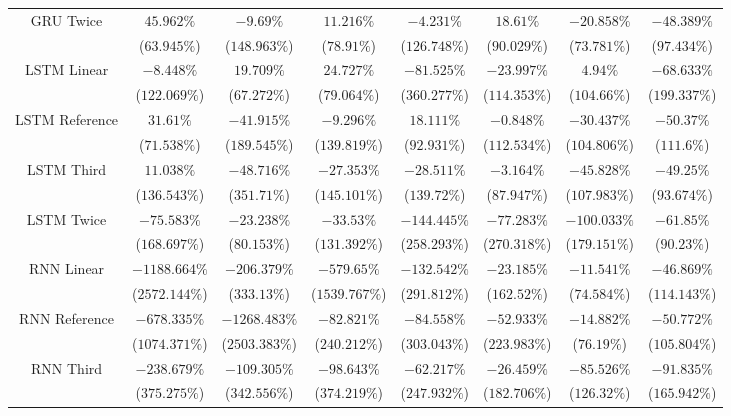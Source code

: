 \begin{table}[!ht]
{\begin{tabular}{|c|c|c|c|c|c|c|c|}
			\multirow{2}{*}{GRU Twice} & $45.962\%$ & $-9.69\%$ & $11.216\%$ & $-4.231\%$ & $18.61\%$ & $-20.858\%$ & $-48.389\%$ \\
			 & ($63.945\%$) & ($148.963\%$) & ($78.91\%$) & ($126.748\%$) & ($90.029\%$) & ($73.781\%$) & ($97.434\%$) \\ \hline
			\multirow{2}{*}{LSTM Linear} & $-8.448\%$ & $19.709\%$ & $24.727\%$ & $-81.525\%$ & $-23.997\%$ & $4.94\%$ & $-68.633\%$ \\
			 & ($122.069\%$) & ($67.272\%$) & ($79.064\%$) & ($360.277\%$) & ($114.353\%$) & ($104.66\%$) & ($199.337\%$) \\ \hline
			\multirow{2}{*}{LSTM Reference} & $31.61\%$ & $-41.915\%$ & $-9.296\%$ & $18.111\%$ & $-0.848\%$ & $-30.437\%$ & $-50.37\%$ \\
			 & ($71.538\%$) & ($189.545\%$) & ($139.819\%$) & ($92.931\%$) & ($112.534\%$) & ($104.806\%$) & ($111.6\%$) \\ \hline
			\multirow{2}{*}{LSTM Third} & $11.038\%$ & $-48.716\%$ & $-27.353\%$ & $-28.511\%$ & $-3.164\%$ & $-45.828\%$ & $-49.25\%$ \\
			 & ($136.543\%$) & ($351.71\%$) & ($145.101\%$) & ($139.72\%$) & ($87.947\%$) & ($107.983\%$) & ($93.674\%$) \\ \hline
			\multirow{2}{*}{LSTM Twice} & $-75.583\%$ & $-23.238\%$ & $-33.53\%$ & $-144.445\%$ & $-77.283\%$ & $-100.033\%$ & $-61.85\%$ \\
			 & ($168.697\%$) & ($80.153\%$) & ($131.392\%$) & ($258.293\%$) & ($270.318\%$) & ($179.151\%$) & ($90.23\%$) \\ \hline
			\multirow{2}{*}{RNN Linear} & $-1188.664\%$ & $-206.379\%$ & $-579.65\%$ & $-132.542\%$ & $-23.185\%$ & $-11.541\%$ & $-46.869\%$ \\
			 & ($2572.144\%$) & ($333.13\%$) & ($1539.767\%$) & ($291.812\%$) & ($162.52\%$) & ($74.584\%$) & ($114.143\%$) \\ \hline
			\multirow{2}{*}{RNN Reference} & $-678.335\%$ & $-1268.483\%$ & $-82.821\%$ & $-84.558\%$ & $-52.933\%$ & $-14.882\%$ & $-50.772\%$ \\
			 & ($1074.371\%$) & ($2503.383\%$) & ($240.212\%$) & ($303.043\%$) & ($223.983\%$) & ($76.19\%$) & ($105.804\%$) \\ \hline
			\multirow{2}{*}{RNN Third} & $-238.679\%$ & $-109.305\%$ & $-98.643\%$ & $-62.217\%$ & $-26.459\%$ & $-85.526\%$ & $-91.835\%$ \\
			 & ($375.275\%$) & ($342.556\%$) & ($374.219\%$) & ($247.932\%$) & ($182.706\%$) & ($126.32\%$) & ($165.942\%$) \\ \hline

\end{tabular}}
\end{table}
